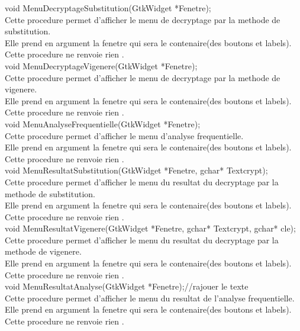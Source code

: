 \documentclass[a4]{article}
\begin{document}
	void MenuDecryptageSubstitution(GtkWidget *Fenetre);\\
		Cette procedure permet d'afficher le menu de decryptage par la methode de substitution.\\
		Elle prend en argument la fenetre qui sera le contenaire(des boutons et labels).\\
		Cette procedure ne renvoie rien .\\
	
	void MenuDecryptageVigenere(GtkWidget *Fenetre);\\
		Cette procedure permet d'afficher le menu de decryptage par la methode de vigenere.\\
		Elle prend en argument la fenetre qui sera le contenaire(des boutons et labels).\\
		Cette procedure ne renvoie rien .\\
	
	void MenuAnalyseFrequentielle(GtkWidget *Fenetre);\\
		Cette procedure permet d'afficher le menu d'analyse frequentielle.\\
		Elle prend en argument la fenetre qui sera le contenaire(des boutons et labels).\\
		Cette procedure ne renvoie rien .\\
	
	void MenuResultatSubstitution(GtkWidget *Fenetre, gchar* Textcrypt);\\
		Cette procedure permet d'afficher le menu du resultat du decryptage par la methode de substitution.\\
		Elle prend en argument la fenetre qui sera le contenaire(des boutons et labels).\\
		Cette procedure ne renvoie rien .\\
	
	void MenuResultatVigenere(GtkWidget *Fenetre, gchar* Textcrypt, gchar* cle);\\
		Cette procedure permet d'afficher le menu du resultat du decryptage par la methode de vigenere.\\
		Elle prend en argument la fenetre qui sera le contenaire(des boutons et labels).\\
		Cette procedure ne renvoie rien .\\
	
	void MenuResultatAnalyse(GtkWidget *Fenetre);//rajouer le texte\\
		Cette procedure permet d'afficher le menu du resultat de l'analyse frequentielle.\\
		Elle prend en argument la fenetre qui sera le contenaire(des boutons et labels).\\
		Cette procedure ne renvoie rien .\\
	
\end{document}

